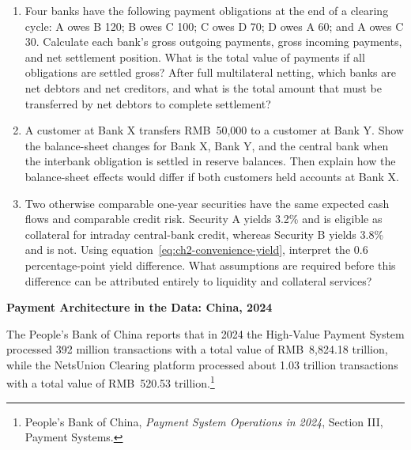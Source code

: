 \begin{enumerate}

\item Four banks have the following payment obligations at the end of a clearing cycle: A owes B 120; B owes C 100; C owes D 70; D owes A 60; and A owes C 30. Calculate each bank's gross outgoing payments, gross incoming payments, and net settlement position. What is the total value of payments if all obligations are settled gross? After full multilateral netting, which banks are net debtors and net creditors, and what is the total amount that must be transferred by net debtors to complete settlement?

\item A customer at Bank X transfers RMB~50,000 to a customer at Bank Y. Show the balance-sheet changes for Bank X, Bank Y, and the central bank when the interbank obligation is settled in reserve balances. Then explain how the balance-sheet effects would differ if both customers held accounts at Bank X.

\item Two otherwise comparable one-year securities have the same expected cash flows and comparable credit risk. Security A yields 3.2\% and is eligible as collateral for intraday central-bank credit, whereas Security B yields 3.8\% and is not. Using equation~\eqref{eq:ch2-convenience-yield}, interpret the 0.6 percentage-point yield difference. What assumptions are required before this difference can be attributed entirely to liquidity and collateral services?

\end{enumerate}



\textbf{Payment Architecture in the Data: China, 2024}

The People's Bank of China reports that in 2024 the High-Value Payment System processed 392 million transactions with a total value of RMB~8,824.18 trillion, while the NetsUnion Clearing platform processed about 1.03 trillion transactions with a total value of RMB~520.53 trillion.\footnote{People's Bank of China, \emph{Payment System Operations in 2024}, Section III, Payment Systems.}

